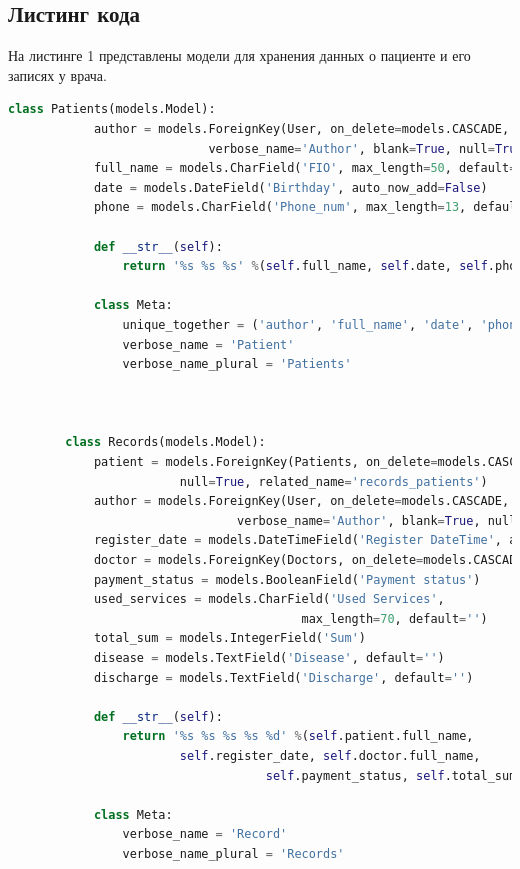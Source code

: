 \documentclass[a4paper, 10pt]{article}
\begin{document}
 	\subsection{Листинг кода}
 
 	
 	
 	\lstset{style=mystyle}
 	
 	\hspace*{5mm} На листинге 1 представлены модели для хранения данных о пациенте и его записях у врача.
 	\begin{lstlisting}[language=Python, caption = Алгоритм сортировки пузырьком]
 		class Patients(models.Model):
 			author = models.ForeignKey(User, on_delete=models.CASCADE, 
 							verbose_name='Author', blank=True, null=True)
 			full_name = models.CharField('FIO', max_length=50, default='')
 			date = models.DateField('Birthday', auto_now_add=False)
 			phone = models.CharField('Phone_num', max_length=13, default='None')
 		
 			def __str__(self):
 				return '%s %s %s' %(self.full_name, self.date, self.phone)
 		
 			class Meta:
 				unique_together = ('author', 'full_name', 'date', 'phone')
 				verbose_name = 'Patient'
 				verbose_name_plural = 'Patients'
 				
 				
 				
 		class Records(models.Model):
 			patient = models.ForeignKey(Patients, on_delete=models.CASCADE, blank=True, 
 						null=True, related_name='records_patients')
 			author = models.ForeignKey(User, on_delete=models.CASCADE, 
 								verbose_name='Author', blank=True, null=True)
 			register_date = models.DateTimeField('Register DateTime', auto_now=True)
 			doctor = models.ForeignKey(Doctors, on_delete=models.CASCADE)
 			payment_status = models.BooleanField('Payment status')
 			used_services = models.CharField('Used Services',
 										 max_length=70, default='')
 			total_sum = models.IntegerField('Sum')
 			disease = models.TextField('Disease', default='')
 			discharge = models.TextField('Discharge', default='')
 		
 			def __str__(self):
 				return '%s %s %s %s %d' %(self.patient.full_name, 
 						self.register_date, self.doctor.full_name, 
 									self.payment_status, self.total_sum)
 		
	 		class Meta:
 				verbose_name = 'Record'
 				verbose_name_plural = 'Records'
 	\end{lstlisting}
  
\end{document}
